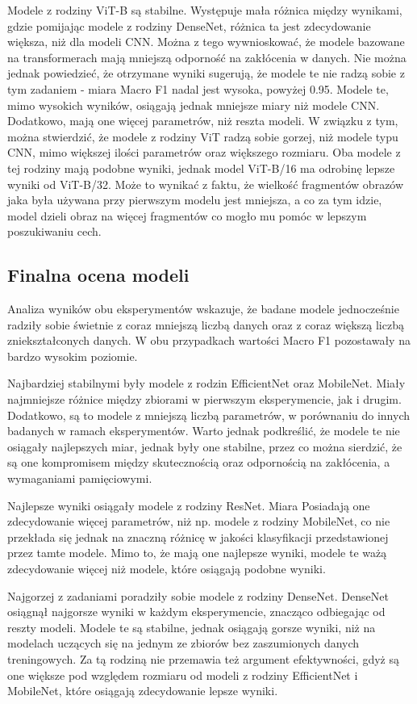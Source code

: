 Modele z rodziny ViT-B są stabilne. Występuje mała różnica między wynikami, gdzie pomijając modele z rodziny DenseNet, różnica ta jest zdecydowanie większa, niż dla modeli CNN. Można z tego wywnioskować, że modele bazowane na transformerach mają mniejszą odporność na zakłócenia w danych. Nie można jednak powiedzieć, że otrzymane wyniki sugerują, że modele te nie radzą sobie z tym zadaniem - miara Macro F1 nadal jest wysoka, powyżej 0.95. Modele te, mimo wysokich wyników, osiągają jednak mniejsze miary niż modele CNN. Dodatkowo, mają one więcej parametrów, niż reszta modeli. W związku z tym, można stwierdzić, że modele z rodziny ViT radzą sobie gorzej, niż modele typu CNN, mimo większej ilości parametrów oraz większego rozmiaru. Oba modele z tej rodziny mają podobne wyniki, jednak model ViT-B/16 ma odrobinę lepsze wyniki od ViT-B/32. Może to wynikać z faktu, że wielkość fragmentów obrazów jaka była używana przy pierwszym modelu jest mniejsza, a co za tym idzie, model dzieli obraz na więcej fragmentów co mogło mu pomóc w lepszym poszukiwaniu cech. 

\subsection{Finalna ocena modeli}

Analiza wyników obu eksperymentów wskazuje, że badane modele jednocześnie radziły sobie świetnie z coraz mniejszą liczbą danych oraz z coraz większą liczbą zniekształconych danych. W obu przypadkach wartości Macro F1 pozostawały na bardzo wysokim poziomie.

Najbardziej stabilnymi były modele z rodzin EfficientNet oraz MobileNet. Miały najmniejsze różnice między zbiorami w pierwszym eksperymencie, jak i drugim. Dodatkowo, są to modele z mniejszą liczbą parametrów, w porównaniu do innych badanych w ramach eksperymentów. Warto jednak podkreślić, że modele te nie osiągały najlepszych miar, jednak były one stabilne, przez co można sierdzić, że są one kompromisem między skutecznością oraz odpornością na zakłócenia, a wymaganiami pamięciowymi.

Najlepsze wyniki osiągały modele z rodziny ResNet. Miara Posiadają one zdecydowanie więcej parametrów, niż np. modele z rodziny MobileNet, co nie przekłada się jednak na znaczną różnicę w jakości klasyfikacji przedstawionej przez tamte modele. Mimo to,  że mają one najlepsze wyniki, modele te ważą zdecydowanie więcej niż modele, które osiągają podobne wyniki.

Najgorzej z zadaniami poradziły sobie modele z rodziny DenseNet. DenseNet osiągnął najgorsze wyniki w każdym eksperymencie, znacząco odbiegając od reszty modeli. Modele te są stabilne, jednak osiągają gorsze wyniki, niż na modelach uczących się na jednym ze zbiorów bez zaszumionych danych treningowych. Za tą rodziną nie przemawia też argument efektywności, gdyż są one większe pod względem rozmiaru od modeli z rodziny EfficientNet i MobileNet, które osiągają zdecydowanie lepsze wyniki.

